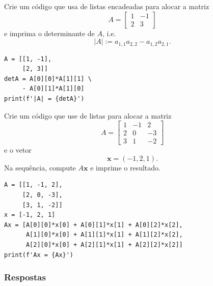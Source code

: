 \begin{exer}
  Crie um código que usa de listas encadeadas para alocar a matriz
  \begin{equation}
    A =
    \begin{bmatrix}
      1 & -1\\
      2 & 3
    \end{bmatrix}
  \end{equation}
  e imprima o determinante de $A$, i.e.
  \begin{equation}
    |A| := a_{1,1}a_{2,2} - a_{1,2}a_{2,1}.
  \end{equation}
\end{exer}
\begin{resp}

\begin{lstlisting}
A = [[1, -1],
     [2, 3]]
detA = A[0][0]*A[1][1] \
     - A[0][1]*A[1][0]
print(f'|A| = {detA}')
\end{lstlisting}

\end{resp}

\begin{exer}
  Crie um código que use de listas para alocar a matriz
  \begin{equation}
    A =
    \begin{bmatrix}
      1 & -1 & 2\\
      2 & 0 & -3\\
      3 & 1 & -2
    \end{bmatrix}
  \end{equation}
  e o vetor
  \begin{equation}
    \pmb{x} = (-1, 2, 1).
  \end{equation}
  Na sequência, compute $A\pmb{x}$ e imprime o resultado.
\end{exer}
\begin{resp}

\begin{lstlisting}
A = [[1, -1, 2],
     [2, 0, -3],
     [3, 1, -2]]
x = [-1, 2, 1]
Ax = [A[0][0]*x[0] + A[0][1]*x[1] + A[0][2]*x[2],
      A[1][0]*x[0] + A[1][1]*x[1] + A[1][2]*x[2],
      A[2][0]*x[0] + A[2][1]*x[1] + A[2][2]*x[2]]
print(f'Ax = {Ax}')
\end{lstlisting}

\end{resp}

\ifisbook
\subsubsection{Respostas}
\shipoutAnswer
\fi